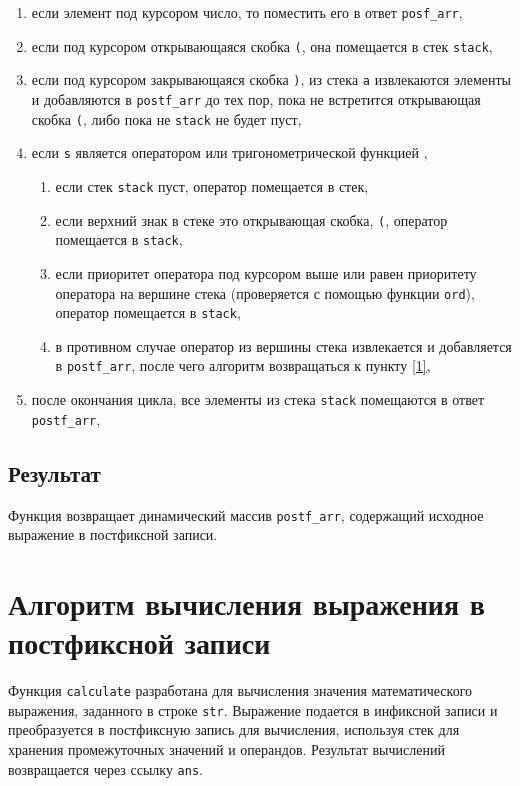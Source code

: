 \begin{enumerate}
	\item если элемент под курсором число, то поместить его в ответ \texttt{posf\_arr},
	
	\item если под курсором открывающаяся скобка \texttt{(}, она помещается в стек \texttt{stack},
	
	\item если под курсором закрывающаяся скобка \texttt{)}, из стека \texttt{a} извлекаются элементы и добавляются в \texttt{postf\_arr} до тех пор, пока не встретится открывающая скобка \texttt{(}, либо пока не \texttt{stack} не будет пуст,

	\item если \texttt{s} является оператором или тригонометрической функцией \label{1},
	\begin{enumerate}
		\item если стек \texttt{stack} пуст, оператор помещается в стек,
		\item если верхний знак в стеке это открывающая скобка, \texttt{(}, оператор помещается в \texttt{stack},
		\item если приоритет оператора под курсором выше или равен приоритету оператора на вершине стека (проверяется с помощью функции \texttt{ord}), оператор помещается в \texttt{stack},
		\item в противном случае оператор из вершины стека извлекается и добавляется в \texttt{postf\_arr}, после чего алгоритм возвращаться к пункту \ref{1},
	\end{enumerate}
	
	\item после окончания цикла, все элементы из стека \texttt{stack} помещаются в ответ \texttt{postf\_arr},
\end{enumerate}

\subsection*{Результат}
Функция возвращает динамический массив \texttt{postf\_arr}, содержащий исходное выражение в постфиксной записи.

\section{Алгоритм вычисления выражения в постфиксной записи}
Функция \texttt{calculate} разработана для вычисления значения математического выражения, заданного в строке \texttt{str}. Выражение подается в инфиксной записи и преобразуется в постфиксную запись для вычисления, используя стек для хранения промежуточных значений и операндов. Результат вычислений возвращается через ссылку \texttt{ans}.

